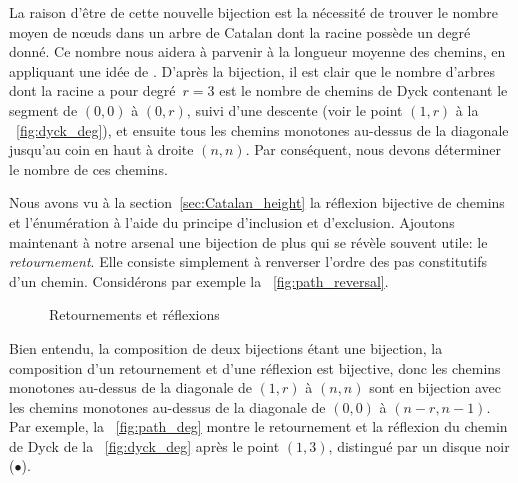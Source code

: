 La raison d'être de cette nouvelle bijection est la nécessité de
trouver le nombre moyen de nœuds dans un arbre de Catalan dont la
racine possède un degré donné. Ce nombre nous aidera à parvenir à la
longueur moyenne des chemins, en appliquant une idée de
\cite{Ruskey_1983}. D'après la bijection, il est clair que le nombre
d'arbres dont la racine a pour degré~\(r=3\) est le nombre de chemins
de Dyck contenant le segment de \((0,0)\) à \((0,r)\), suivi d'une
descente (voir le point \((1,r)\) à la \fig~\ref{fig:dyck_deg}), et
ensuite tous les chemins monotones au-dessus de la diagonale jusqu'au
coin en haut à droite \((n,n)\).  Par conséquent, nous devons
déterminer le nombre de ces chemins.

Nous avons vu à la section~\vref{sec:Catalan_height} la réflexion
bijective de chemins et l'énumération à l'aide du principe d'inclusion
et d'exclusion. Ajoutons maintenant à notre arsenal une bijection de
plus qui se révèle souvent utile: le \emph{retournement}. Elle
consiste simplement à renverser l'ordre des pas constitutifs d'un
chemin. Considérons par exemple la \fig~\ref{fig:path_reversal}.
\begin{figure}
\centering
{}
\qquad
{}
\caption{Retournements et réflexions}
\end{figure}
Bien entendu, la composition de deux bijections étant une bijection,
la composition d'un retournement et d'une réflexion est bijective,
donc les chemins monotones au-dessus de la diagonale de \((1,r)\) à
\((n,n)\) sont en bijection avec les chemins monotones au-dessus de la
diagonale de \((0,0)\) à \((n-r,n-1)\). Par exemple, la
\fig~\ref{fig:path_deg} montre le retournement et la réflexion du
chemin de Dyck de la \fig~\ref{fig:dyck_deg} après le point \((1,3)\),
distingué par un disque noir (\(\bullet\)).

